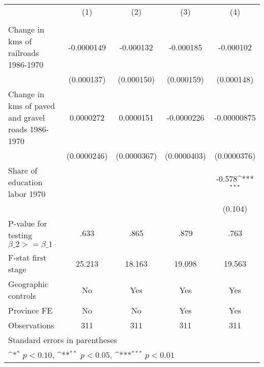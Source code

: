 {
\def\sym#1{\ifmmode^{#1}\else\(^{#1}\)\fi}
\begin{tabular}{l*{4}{c}}
\hline\hline
                &\multicolumn{1}{c}{(1)}&\multicolumn{1}{c}{(2)}&\multicolumn{1}{c}{(3)}&\multicolumn{1}{c}{(4)}\\
                &\multicolumn{1}{c}{}&\multicolumn{1}{c}{}&\multicolumn{1}{c}{}&\multicolumn{1}{c}{}\\
\hline
Change in kms of railroads 1986-1970&-0.0000149         &-0.000132         &-0.000185         &-0.000102         \\
                &(0.000137)         &(0.000150)         &(0.000159)         &(0.000148)         \\
[1em]
Change in kms of paved and gravel roads 1986-1970&0.0000272         &0.0000151         &-0.0000226         &-0.00000875         \\
                &(0.0000246)         &(0.0000367)         &(0.0000403)         &(0.0000376)         \\
[1em]
Share of education labor 1970&                  &                  &                  &   -0.578\sym{***}\\
                &                  &                  &                  &  (0.104)         \\
\hline
P-value for testing $\beta\_{2} >= \beta\_{1}$&     .633         &     .865         &     .879         &     .763         \\
F-stat first stage&   25.213         &   18.163         &   19.098         &   19.563         \\
Geographic controls&       No         &      Yes         &      Yes         &      Yes         \\
Province FE     &       No         &       No         &      Yes         &      Yes         \\
Observations    &      311         &      311         &      311         &      311         \\
\hline\hline
\multicolumn{5}{l}{\footnotesize Standard errors in parentheses}\\
\multicolumn{5}{l}{\footnotesize \sym{*} \(p<0.10\), \sym{**} \(p<0.05\), \sym{***} \(p<0.01\)}\\
\end{tabular}
}
